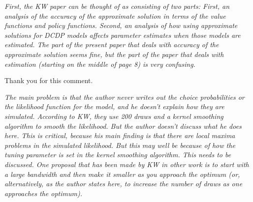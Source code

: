 \begin{boenumerate}
\item \textit{First, the KW paper can be thought of as consisting of two parts: First, an analysis of the accuracy of the approximate solution in terms of the value functions and policy functions. Second, an analysis of how using approximate solutions for DCDP models affects parameter estimates when those models are estimated. The part of the present paper that deals with accuracy of the approximate solution seems fine, but the part of the paper that deals with estimation (starting on the middle of page 8) is very confusing.}\vspace{0.5cm}

Thank you for this comment.\vspace{0.50cm}
\item \textit{The main problem is that the author never writes out the choice probabilities or the likelihood function for the model, and he doesn't explain how they are simulated. According to KW, they use 200 draws and a kernel smoothing algorithm to smooth the likelihood. But the author doesn't discuss what he does here. This is critical, because his main finding is that there are local maxima problems in the simulated likelihood. But this may well be because of how the tuning parameter is set in the kernel smoothing algorithm. This needs to be discussed. One proposal that has been made by KW in other work is to start with a large bandwidth and then make it smaller as you approach the optimum (or, alternatively, as the author states here, to increase the number of draws as one approaches the optimum).}\vspace{0.5cm}


\end{boenumerate}
